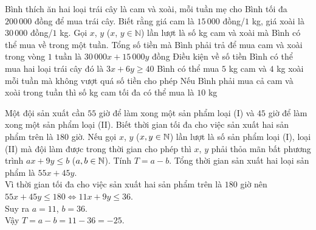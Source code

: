 \begin{ex}%
	Bình thích ăn hai loại trái cây là cam và xoài, mỗi tuần mẹ cho Bình tối đa $200\,000$ đồng để mua trái cây. Biết rằng giá cam là $15\,000$ đồng/$ 1 $ kg, giá xoài là $30\,000$ đồng/$ 1 $ kg. Gọi $x$,  $y$ ($x$, $y \in \mathbb{N}$) lần lượt là số kg cam và xoài mà Bình có thể mua về trong một tuần.
	\choiceTF
	{Tổng số tiền mà Bình phải trả để mua cam và xoài trong vòng $ 1 $ tuần là $30\,000 x+15\,000 y$ đồng}
	{Điều kiện về số tiền Bình có thể mua hai loại trái cây đó là $3 x+6 y \ge 40$}
	{\True Bình có thể mua $ 5 $ kg cam và $ 4 $ kg xoài mỗi tuần mà không vượt quá số tiền cho phép}
	{Nếu Bình phải mua cả cam và xoài trong tuần thì số kg cam tối đa có thể mua là $ 10 $ kg}
\end{ex}

\begin{bt}%
	Một đội sản xuất cần $55$ giờ để làm xong một sản phẩm loại (I) và $45$ giờ để làm xong một sản phẩm loại (II). Biết thời gian tối đa cho việc sản xuất hai sản phẩm trên là $180$ giờ. Nếu gọi $x$, $y$ ($x, y\in \Bbb{N}$) lần lượt là số sản phẩm loại (I), loại (II) mà đội làm được trong thời gian cho phép thì $x$, $y$ phải thỏa mãn bất phương trình $ax+9y\le b$ ($a, b\in \Bbb{N}$). Tính $T=a-b$.
	\loigiai
	{
		Tổng thời gian sản xuất hai loại sản phẩm là $55x+45y$.\\
		Vì thời gian tối đa cho việc sản xuất hai sản phẩm trên là $180$ giờ nên $55x+45y\le 180\Leftrightarrow 11x+9y\le 36$.\\
		Suy ra $a=11$, $b=36$.\\
		Vậy $T=a-b=11-36=-25$.
	}
\end{bt}

